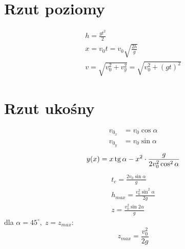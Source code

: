     \section{Rzut poziomy}
      \begin{gather}
        h = \frac{gt^2}{2}\\
        x = v_0t = v_0\sqrt{\frac{2h}{g}}\\
        v = \sqrt{v_0^2 + v_y^2} = \sqrt{v_0^2 + (gt)^2}
      \end{gather}
    \section{Rzut ukośny}
      \begin{align}
        v_{0_x} &= v_0\cos\alpha\\
        v_{0_y} &= v_0\sin\alpha
      \end{align}
      \begin{equation}
        y(x) = x\operatorname{tg}\alpha - x^2\cdot \frac{g}{2v_0^2\cos^2\alpha}
      \end{equation}
      \begin{gather}
        t_c = \frac{2v_0\sin\alpha}{g}\\
        h_{max} = \frac{v_0^2\sin^2\alpha}{2g}\\
        z = \frac{v_0^2\sin 2\alpha}{g}
      \end{gather}
      dla $\alpha = 45^\circ,\; z = z_{max}$:
      \begin{equation}
        z_{max} = \frac{v_0^2}{2g}
      \end{equation}
